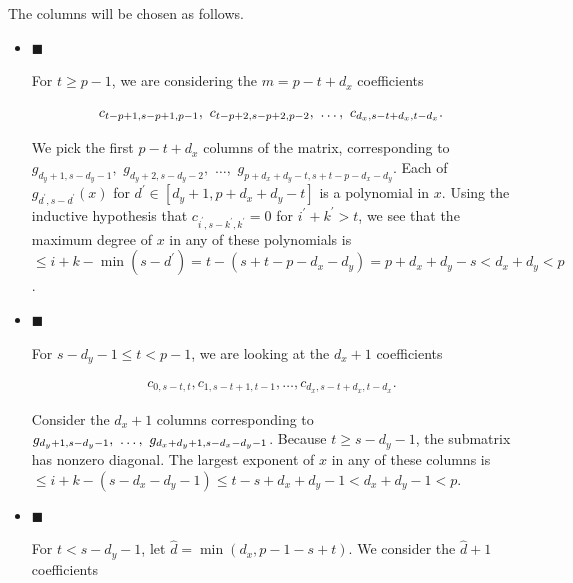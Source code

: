 \documentclass[10pt,a4paper]{article}
\begin{document}
The columns will be chosen as follows.\par


\begin{itemize}


\item[] 
$\blacksquare$ 


For $t\geq p-1$, we are considering the $m=p-t+d_{x}$ coefficients\par


\[\begin{gathered}
c_{t-p+1,s-p+1,p-1},\nobreak\ c_{t-p+2,s-p+2,p-2},\nobreak\ \dots,\nobreak\ c_{d_{x},s-t+d_{x},t-d_{x}}.
\end{gathered}\]


We pick the first $p-t+d_{x}$ columns of the matrix, corresponding to $g_{d_{y}+1,s-d_{y}-1},$ $g_{d_{y}+2,s-d_{y}-2},$ $\dots,$ $g_{p+d_{x}+d_{y}-t,s+t-p-d_{x}-d_{y}}$. Each of $g_{d^{\prime},s-d^{\prime}}(x)$ for $d^{\prime}\in[d_{y}+1,p+d_{x}+d_{y}-t]$ is a polynomial in $x$. Using the inductive hypothesis that $c_{i^{\prime},s-k^{\prime},k^{\prime}}=0$ for $i^{\prime}+k^{\prime}>t$, we see that the maximum degree of $x$ in any of these polynomials is $\leq i+k-\min(s-d^{\prime})=t-(s+t-p-d_{x}-d_{y})=p+d_{x}+d_{y}-s<d_{x}+d_{y}<p$.\par





\item[] 
$\blacksquare$ 


For $s-d_{y}-1\leq t<p-1$, we are looking at the $d_{x}+1$ coefficients\par


\[\begin{gathered}
c_{0,s-t,t},c_{1,s-t+1,t-1},\dots,c_{d_{x},s-t+d_{x},t-d_{x}}.
\end{gathered}\]


Consider the $d_{x}+1$ columns corresponding to $g_{d_{y}+1,s-d_{y}-1},\nobreak\ \dots,\nobreak\ g_{d_{x}+d_{y}+1,s-d_{x}-d_{y}-1}$. Because $t\geq s-d_{y}-1$, the submatrix has nonzero diagonal. The largest exponent of $x$ in any of these columns is $\leq i+k-(s-d_{x}-d_{y}-1)\leq t-s+d_{x}+d_{y}-1<d_{x}+d_{y}-1<p$.\par





\item[] 
$\blacksquare$ 


For $t<s-d_{y}-1$, let $\hat{d}=\min(d_{x},p-1-s+t)$. We consider the $\hat{d}+1$ coefficients\par



\end{itemize}
\end{document}
